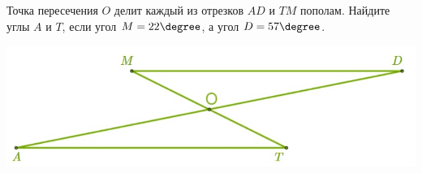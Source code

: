\begin{class}[number=6]
\begin{listofex}
\begin{minipage}[c]{\picwidth}
		\end{minipage}
		\item Точка пересечения \( O \) делит каждый из отрезков \( AD \) и \( TM \) пополам. Найдите углы \(A\) и \(T\), если угол \(M = 22 \degree\), а угол \(D = 57 \degree\).
		\begin{center}
			\includegraphics[width=0.6\linewidth]{pics/G71M4C5-2.jpg}
		\end{center}
	\end{listofex}
\end{class}
%
%
%
%		
%
%
